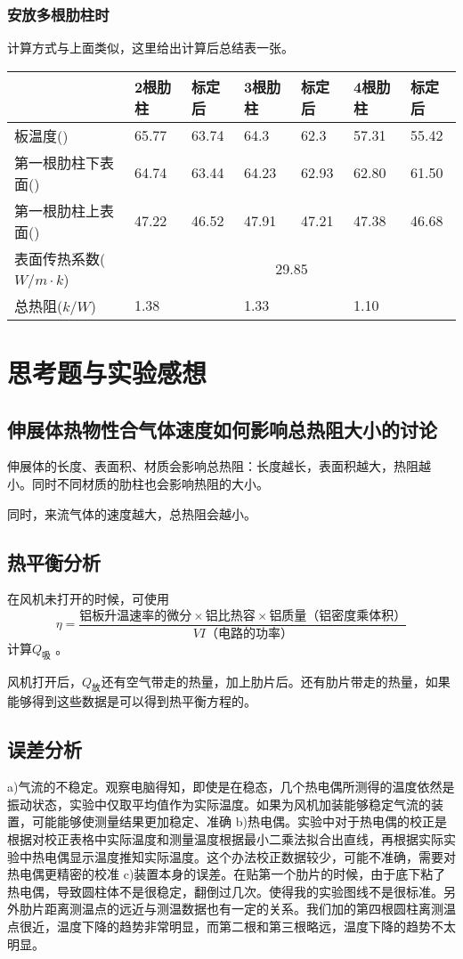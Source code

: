 \documentclass[UTF8,a4paper,10pt]{ctexart}
\begin{document}
	\subsubsection{安放多根肋柱时}
	计算方式与上面类似，这里给出计算后总结表一张。
	\begin{table}[h]
		\begin{tabular}{|l|l|l|l|l|l|l|}
			\hline
			& 2根肋柱 & 标定后 & 3根肋柱 & 标定后 & 4根肋柱 & 标定后 \\ \hline
			板温度(\textcelsius) & 65.77 & 63.74 & 64.3 & 62.3 & 57.31 & 55.42 \\ \hline
			第一根肋柱下表面(\textcelsius) & 64.74 & 63.44 & 64.23 & 62.93 & 62.80 & 61.50 \\ \hline
			第一根肋柱上表面(\textcelsius) & 47.22 & 46.52 & 47.91 & 47.21 & 47.38 & 46.68 \\ \hline
			表面传热系数($W/m\cdot{k}$) & \multicolumn{6}{c|}{29.85} \\ \hline
			总热阻($k/W$) & \multicolumn{2}{l|}{1.38} & \multicolumn{2}{l|}{1.33} & \multicolumn{2}{l|}{1.10} \\ \hline
		\end{tabular}
	\end{table}
	
	\section{思考题与实验感想}
	\subsection{伸展体热物性合气体速度如何影响总热阻大小的讨论}
	伸展体的长度、表面积、材质会影响总热阻：长度越长，表面积越大，热阻越
	小。同时不同材质的肋柱也会影响热阻的大小。
	
	同时，来流气体的速度越大，总热阻会越小。
	\subsection{热平衡分析}
	在风机未打开的时候，可使用
	$$\eta=\dfrac{\text{铝板升温速率的微分}\times\text{铝比热容}\times\text{铝质量（铝密度乘体积）}}{VI\text{（电路的功率）}}$$计算$Q_{\text{吸}}$
	。
	
	风机打开后，$Q_{\text{放}}$还有空气带走的热量，加上肋片后。还有肋片带走的热量，如果能够得到这些数据是可以得到热平衡方程的。
	\subsection{误差分析}
	a)气流的不稳定。观察电脑得知，即使是在稳态，几个热电偶所测得的温度依然是振动状态，实验中仅取平均值作为实际温度。如果为风机加装能够稳定气流的装置，可能能够使测量结果更加稳定、准确
	b)热电偶。实验中对于热电偶的校正是根据对校正表格中实际温度和测量温度根据最小二乘法拟合出直线，再根据实际实验中热电偶显示温度推知实际温度。这个办法校正数据较少，可能不准确，需要对热电偶更精密的校准
	c)装置本身的误差。在贴第一个肋片的时候，由于底下粘了热电偶，导致圆柱体不是很稳定，翻倒过几次。使得我的实验图线不是很标准。另外肋片距离测温点的远近与测温数据也有一定的关系。我们加的第四根圆柱离测温点很近，温度下降的趋势非常明显，而第二根和第三根略远，温度下降的趋势不太明显。
\end{document}
